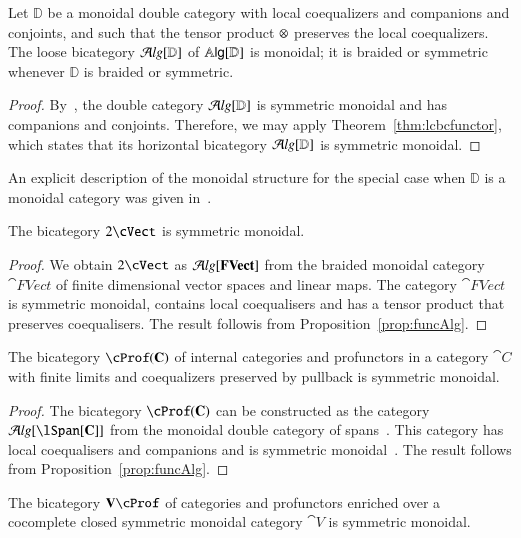 \begin{prop}\label{thm:eqcomp}
Let $\mathbb{D}$ be a monoidal double category with local coequalizers and companions and conjoints, and such that the tensor product $\otimes$ preserves the local coequalizers. The loose bicategory $\mathcal{A}\mathit{lg}[\mathbb{D}]$ of $\mathbb{A}\mathsf{lg}[\mathbb{D}]$ is monoidal; it is braided or symmetric whenever $\mathbb{D}$ is braided or symmetric.
\end{prop}

\begin{proof}
By~\cite[Examples 9.2]{shulman:frbi}, the double category $\mathcal{A}\mathit{lg}[\mathbb{D}]$ is symmetric monoidal and has companions and conjoints. Therefore, we may apply Theorem~\ref{thm:lcbcfunctor}, which states that its horizontal bicategory $\mathcal{A}\mathit{lg}[\mathbb{D}]$ is symmetric monoidal.
\end{proof}


An explicit description of the monoidal structure for the special case when ${\mathbb{D}}$ is a monoidal category was given in~\cite{westerPhDthesis}. 

\begin{cor}
The bicategory $2\cVect$ is symmetric monoidal.
\end{cor}

\begin{proof}
We obtain $2\cVect$ as $\mathcal{A}\mathit{lg}[\mathbf{FVect}]$ from the braided monoidal category $\cat{FVect}$ of finite dimensional vector spaces and linear maps. The category $\cat{FVect}$ is symmetric monoidal, contains local coequalisers and has a tensor product that preserves coequalisers. The result followis from Proposition~\ref{prop:funcAlg}.
\end{proof}

\begin{cor}
The bicategory $\cProf(\cat{C})$ of internal categories and profunctors in a category $\cat{C}$ with finite limits and coequalizers preserved by pullback is symmetric monoidal.
\end{cor}

\begin{proof}
The bicategory $\cProf(\cat{C})$ can be constructed as the category $\cAlg[\lSpan[\cat{C}]]$ from the monoidal double category of spans~\cite[Examples 4.2]{shulman:frbi}.
This category has local coequalisers and companions and is symmetric monoidal~\cite[Examples 4.15, 9.2]{shulman:frbi}. The result follows from Proposition~\ref{prop:funcAlg}.
\end{proof}

\begin{cor}
The bicategory $\cat{V}\cProf$ of categories and profunctors enriched over a cocomplete closed symmetric monoidal category $\cat{V}$ is symmetric monoidal.
\end{cor}

